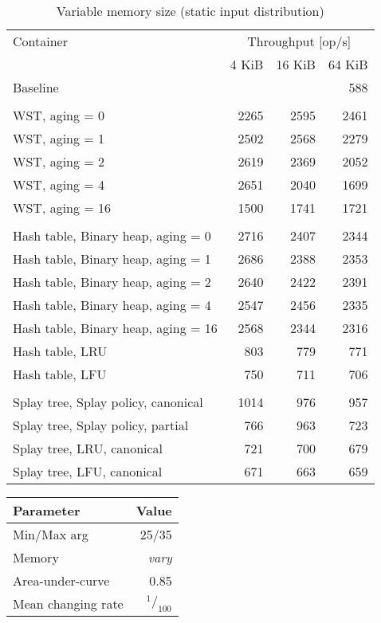 \begin{table}
\caption{Variable memory size (static input distribution)}
\begin{tabular}[b]{l  r  r  r } \toprule
Container & \multicolumn{3}{c}{Throughput [op/s]} \\ \cmidrule(r){2-4}
& 4 KiB & 16 KiB & 64 KiB \\ \midrule
Baseline & \multicolumn{3}{r}{588}  \\
\\
WST, aging = 0 & 2265 & 2595 & 2461 \\
WST, aging = 1 & 2502 & 2568 & 2279 \\
WST, aging = 2 & 2619 & 2369 & 2052 \\
WST, aging = 4 & 2651 & 2040 & 1699 \\
WST, aging = 16 & 1500 & 1741 & 1721 \\
\\
Hash table, Binary heap, aging = 0 & 2716 & 2407 & 2344 \\
Hash table, Binary heap, aging = 1 & 2686 & 2388 & 2353 \\
Hash table, Binary heap, aging = 2 & 2640 & 2422 & 2391 \\
Hash table, Binary heap, aging = 4 & 2547 & 2456 & 2335 \\
Hash table, Binary heap, aging = 16 & 2568 & 2344 & 2316 \\
Hash table, LRU & 803 & 779 & 771 \\
Hash table, LFU & 750 & 711 & 706 \\
\\
Splay tree, Splay policy, canonical & 1014 & 976 & 957 \\
Splay tree, Splay policy, partial & 766 & 963 & 723 \\
Splay tree, LRU, canonical & 721 & 700 & 679 \\
Splay tree, LFU, canonical & 671 & 663 & 659 \\
\bottomrule
\end{tabular}
\end{table}


\pagebreak

\begin{tabular}[h]{l r} \toprule
Parameter & Value \\ \midrule
Min/Max arg & 25/35 \\
Memory & \emph{vary} \\
Area-under-curve & 0.85 \\
Mean changing rate & $^1/_{100}$ \\ \bottomrule
\end{tabular}

